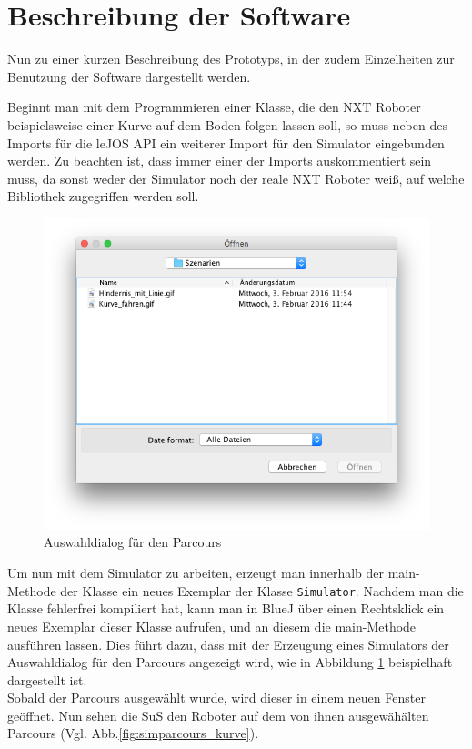 \documentclass[paper=a4, pagesize, DIV=calc, BCOR=15.5mm, twoside=on, onecolumn=on, open = right, titlepage =on, parskip =half-, headsepline = on, footsepline = on, chapterprefix = on, appendixprefix = off, fontsize = 12pt, numbers = noenddot, abstract = on]{scrbook}
\numberwithin{equation}{chapter}
\theoremstyle{definition}
\theoremstyle{plain}
\theoremstyle{plain}
\theoremstyle{remark}
\theoremstyle{plain}
\theoremstyle{plain}
\begin{document}
\par \singlespacing
\section{Beschreibung der Software}
\onehalfspacing

Nun zu einer kurzen Beschreibung des Prototyps, in der zudem Einzelheiten zur Benutzung der Software dargestellt werden.

Beginnt man mit dem Programmieren einer Klasse, die den NXT Roboter beispielsweise einer Kurve auf dem Boden folgen lassen soll, so muss neben des Imports für die leJOS API ein weiterer Import für den Simulator eingebunden werden. Zu beachten ist, dass immer einer der Imports auskommentiert sein muss, da sonst weder der Simulator noch der reale NXT Roboter weiß, auf welche Bibliothek zugegriffen werden soll.

\begin{figure}[H]
\centering
\includegraphics[scale=0.45]{images/dialog_szenarien.png} 
\caption{Auswahldialog für den Parcours}
\label{fig:auswahldialog}
\end{figure}

Um nun mit dem Simulator zu arbeiten, erzeugt man innerhalb der main-Methode der Klasse ein neues Exemplar der Klasse \texttt{Simulator}. Nachdem man die Klasse fehlerfrei kompiliert hat, kann man in BlueJ über einen Rechtsklick ein neues Exemplar dieser Klasse aufrufen, und an diesem die main-Methode ausführen lassen. Dies führt dazu, dass mit der Erzeugung eines Simulators der Auswahldialog für den Parcours angezeigt wird, wie in Abbildung \ref{fig:auswahldialog} beispielhaft dargestellt ist.\\
Sobald der Parcours ausgewählt wurde, wird dieser in einem neuen Fenster geöffnet. Nun sehen die SuS den Roboter auf dem von ihnen ausgewähälten Parcours (Vgl. Abb.\ref{fig:simparcours_kurve}).
\end{document}
